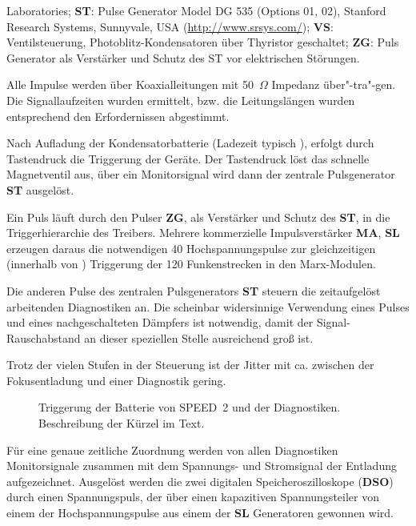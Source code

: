 Laboratories;
 {\bf ST}: Pulse Generator Model DG 535 (Options 01, 02),
Stanford Research Systems, Sunnyvale, USA (\url{http://www.srsys.com/});
 {\bf VS}: Ventilsteuerung,
Photoblitz-Kondensatoren über Thyristor geschaltet;
 {\bf ZG}: Puls Generator
\cite{maelzig:phd} als Verstärker und Schutz des ST vor elektrischen
Störungen.
\par
Alle Impulse werden über Koaxialleitungen mit 50~$\Omega$ Impedanz
über"-tra"-gen. Die Signallaufzeiten wurden ermittelt, bzw. die
Leitungslängen wurden entsprechend den Erfordernissen abgestimmt.
\par
Nach Aufladung der Kondensatorbatterie (Ladezeit typisch
), erfolgt durch Tastendruck die Triggerung der
Geräte. Der Tastendruck löst das schnelle Magnetventil aus, über
ein Monitorsignal wird dann der zentrale Pulsgenerator {\bf ST}
ausgelöst.
\par
Ein Puls läuft durch den Pulser {\bf ZG}, als Verstärker und
Schutz des {\bf ST}, in die Triggerhierarchie des Treibers.
Mehrere kommerzielle Impulsverstärker {\bf MA}, {\bf SL} erzeugen
daraus die notwendigen 40 Hochspannungspulse zur gleichzeitigen
(innerhalb von ) Triggerung der 120 Funkenstrecken in
den Marx-Modulen.
\par
Die anderen Pulse des zentralen Pulsgenerators {\bf ST} steuern
die zeitaufgelöst arbeitenden Diagnostiken an. Die scheinbar
widersinnige Verwendung eines  Pulses und eines
nachgeschalteten Dämpfers ist notwendig, damit der
Signal-Rauschabstand an dieser speziellen Stelle ausreichend groß
ist.
\par
Trotz der vielen Stufen in der Steuerung ist der Jitter mit ca.
 zwischen der Fokusentladung und einer Diagnostik
gering.
%
\par
\begin{figure}[H]
  \center
  \caption{Triggerung der Batterie von SPEED~2 und der Diagnostiken.
     Beschreibung der Kürzel im Text.}
  \label{fig:triggerung}
\end{figure}
%
\par
Für eine genaue zeitliche Zuordnung werden von allen Diagnostiken
Monitorsignale zusammen mit dem Spannungs- und Stromsignal der
Entladung aufgezeichnet. Ausgelöst werden die zwei digitalen
Speicheroszilloskope ({\bf DSO}) durch einen Spannungspuls, der
über einen kapazitiven Spannungsteiler von einem der
Hochspannungspulse aus einem der {\bf SL} Generatoren gewonnen
wird.
